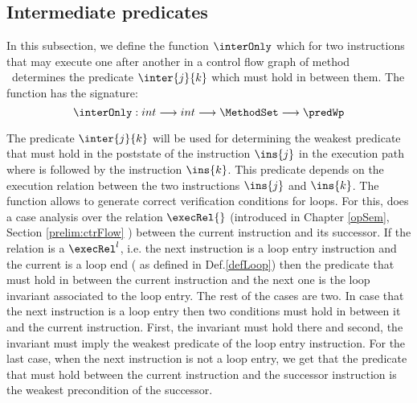 \newtheorem{defInter}{Definition}[subsection]
\subsection{Intermediate predicates} \label{wp:interPred}
In this subsection, we define the function $\interOnly$ which for two instructions that may execute one
after another in a control flow graph  of  method \methodd \ determines the predicate $\inter{j}{k}$ which must hold in between them.
The function has the signature:
$$ \interOnly: int \longrightarrow int  \longrightarrow \MethodSet \longrightarrow \predWp $$ 


 The predicate $\inter{j}{k}$ will be used for determining the weakest predicate that must hold in the poststate of the instruction
 $\ins{j}$ in the execution path where   is followed by the instruction $\ins{k}$.
 This predicate depends on the execution relation between the two instructions $\ins{j}$ and $\ins{k}$.
 The function \interOnly{} allows to generate correct verification conditions for loops. For this,  \inter{} does a case analysis 
 over the relation $\execRel{}$ (introduced  in Chapter \ref{opSem}, Section \ref{prelim:ctrFlow} ) between the current instruction and its successor.
 If the relation is a $\execRel^{l}$, i.e. the next instruction is a loop entry instruction and the current is a loop end
( as defined in Def.\ref{defLoop}) 
 then the predicate that must hold in between the current instruction and the next one is the loop invariant associated to the loop entry.
The rest of the cases are two. In case that the next instruction is a loop entry then two conditions must hold in between it and the
current instruction. First, the invariant must hold there and second, the invariant must imply the weakest predicate of the loop entry instruction.
For the last case, when the next instruction is not a loop entry, we get that the predicate that must hold between the current instruction 
and the successor instruction is the weakest precondition of the successor.  


